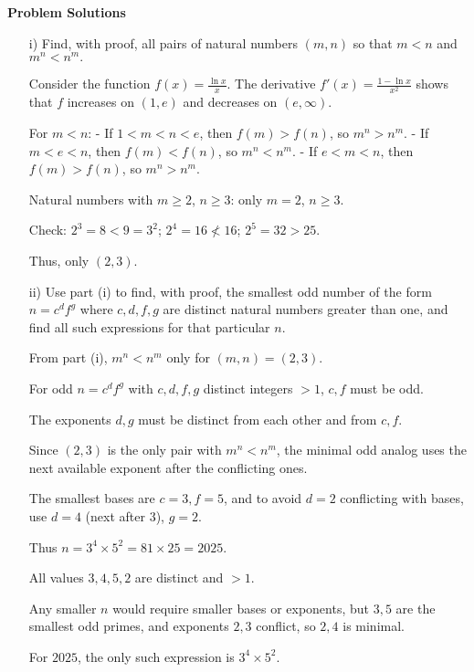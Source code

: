 \documentclass[10pt]{article}
\begin{document}
\textbf{Problem Solutions}

\begin{enumerate}
\item[i)] Find, with proof, all pairs of natural numbers $(m,n)$ so that $m<n$ and $m^n < n^m.$

Consider the function $f(x) = \frac{\ln x}{x}$. The derivative $f'(x) = \frac{1 - \ln x}{x^2}$ shows that $f$ increases on $(1, e)$ and decreases on $(e, \infty)$.

For $m < n$:
- If $1 < m < n < e$, then $f(m) > f(n)$, so $m^n > n^m$.
- If $m < e < n$, then $f(m) < f(n)$, so $m^n < n^m$.
- If $e < m < n$, then $f(m) > f(n)$, so $m^n > n^m$.

Natural numbers with $m \geq 2$, $n \geq 3$: only $m=2$, $n \geq 3$.

Check: $2^3 = 8 < 9 = 3^2$; $2^4 = 16 \not< 16$; $2^5 = 32 > 25$.

Thus, only $(2,3)$.

\item[ii)] Use part (i) to find, with proof, the smallest odd number of the form $n = c^d f^g$ where $c, d, f, g$ are distinct natural numbers greater than one, and find all such expressions for that particular $n$.

From part (i), $m^n < n^m$ only for $(m,n)=(2,3)$.

For odd $n = c^d f^g$ with $c,d,f,g$ distinct integers $>1$, $c,f$ must be odd.

The exponents $d,g$ must be distinct from each other and from $c,f$.

Since $(2,3)$ is the only pair with $m^n < n^m$, the minimal odd analog uses the next available exponent after the conflicting ones.

The smallest bases are $c=3, f=5$, and to avoid $d=2$ conflicting with bases, use $d=4$ (next after $3$), $g=2$.

Thus $n = 3^4 \times 5^2 = 81 \times 25 = 2025$.

All values $3,4,5,2$ are distinct and $>1$.

Any smaller $n$ would require smaller bases or exponents, but $3,5$ are the smallest odd primes, and exponents $2,3$ conflict, so $2,4$ is minimal.

For $2025$, the only such expression is $3^4 \times 5^2$.

\end{enumerate}
\end{document}
